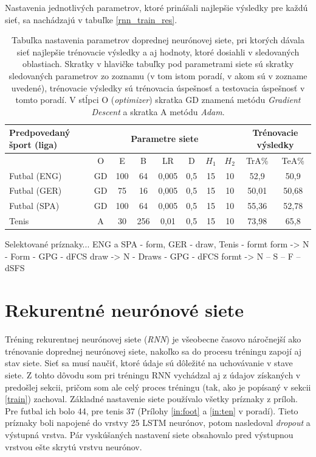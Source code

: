 Nastavenia jednotlivých parametrov, ktoré prinášali najlepšie výsledky pre každú sieť, sa nachádzajú v tabuľke \ref{rnn_train_res}.

\begin{table}[h!]
\begin{center}
\begin{tabular}{ p{7em}|c|c|c|c|c|c|c|c|c| } 
 Predpovedaný šport (liga) & \multicolumn{7}{|c|}{Parametre siete} & \multicolumn{2}{|p{5em}|}{Trénovacie výsledky}  \\ 
 \hline
  & O & E & B & LR & D & $H_1$ & $H_2$ & TrA\% & TeA\% \\
 \hline \hline
 Futbal (ENG) & GD & 100 & 64 & 0,005 & 0,5 & 15 & 10 & 52,9 & 50,9  \\ 
 Futbal (GER) & GD & 75 & 16 & 0,005 & 0,5 & 15 & 10 & 50,01 & 50,68  \\ 
 Futbal (SPA) & GD & 100 & 64 & 0,005 & 0,5 & 15 & 10 & 55,36 & 52,78  \\ 
 Tenis & A & 30 & 256 & 0,01 & 0,5 & 15 & 10 & 73,98 & 65,8  \\ 
 \hline
\end{tabular}
\caption{Tabuľka nastavenia parametrov doprednej neurónovej siete, pri ktorých dávala sieť najlepšie trénovacie výsledky a aj hodnoty, ktoré dosiahli v sledovaných oblastiach. Skratky v hlavičke tabuľky pod parametrami siete sú skratky sledovaných parametrov zo zoznamu (v tom istom poradí, v akom sú v zozname uvedené), trénovacie výsledky sú trénovacia úspešnosť a testovacia úspešnosť v tomto poradí. V stĺpci O (\textit{optimizer}) skratka GD znamená metódu \textit{Gradient Descent} a skratka A metódu \textit{Adam}.}
\label{ff_train_res}
\end{center}
\end{table}

Selektované príznaky...
ENG a SPA - form, GER - draw, Tenis - formt
form -> N - Form - GPG - dFCS
draw -> N - Draws - GPG - dFCS
formt -> N – S – F – dSFS



\section{Rekurentné neurónové siete} \label{rnn:train}
Tréning rekurentnej neurónovej siete (\textit{RNN}) je všeobecne časovo náročnejší ako trénovanie doprednej neurónovej siete, nakoľko sa do procesu tréningu zapojí aj stav siete. Sieť sa musí naučiť, ktoré údaje sú dôležité na uchovávanie v stave siete.
Z tohto dôvodu som pri tréningu RNN vychádzal aj z údajov získaných v predošlej sekcii, pričom som ale celý proces tréningu (tak, ako je popísaný v sekcii \ref{train}) zachoval.
Základné nastavenie siete používalo všetky príznaky z príloh. 
Pre futbal ich bolo 44, pre tenis 37 (Prílohy \ref{in:foot} a \ref{in:ten} v poradí).
Tieto príznaky boli napojené do vrstvy 25 LSTM neurónov, potom nasledoval \textit{dropout} a výstupná vrstva.
Pár vyskúšaných nastavení siete obsahovalo pred výstupnou vrstvou ešte skrytú vrstvu neurónov.

